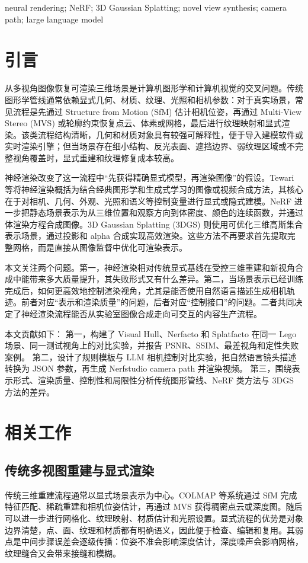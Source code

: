 \documentclass[a4paper, 12pt, centering]{article}
\begin{document}
\begin{enkeys}
neural rendering; NeRF; 3D Gaussian Splatting; novel view synthesis; camera path; large language model
\end{enkeys}
\newpage

\tableofcontents
\newpage

\section{引言}
从多视角图像恢复可渲染三维场景是计算机图形学和计算机视觉的交叉问题。传统图形学管线通常依赖显式几何、材质、纹理、光照和相机参数：对于真实场景，常见流程是先通过 Structure from Motion (SfM) 估计相机位姿，再通过 Multi-View Stereo (MVS) 或轮廓约束恢复点云、体素或网格，最后进行纹理映射和显式渲染。该类流程结构清晰，几何和材质对象具有较强可解释性，便于导入建模软件或实时渲染引擎；但当场景存在细小结构、反光表面、遮挡边界、弱纹理区域或不完整视角覆盖时，显式重建和纹理修复成本较高。

神经渲染改变了这一流程中“先获得精确显式模型，再渲染图像”的假设。Tewari 等将神经渲染概括为结合经典图形学和生成式学习的图像或视频合成方法，其核心在于对相机、几何、外观、光照和语义等控制变量进行显式或隐式建模\cite{tewari2020state}。NeRF 进一步把静态场景表示为从三维位置和观察方向到体密度、颜色的连续函数，并通过体渲染方程合成图像\cite{mildenhall2020nerf}。3D Gaussian Splatting (3DGS) 则使用可优化三维高斯集合表示场景，通过投影和 alpha 合成实现高效渲染\cite{kerbl2023gaussians}。这些方法不再要求首先提取完整网格，而是直接从图像监督中优化可渲染表示。

本文关注两个问题。第一，神经渲染相对传统显式基线在受控三维重建和新视角合成中能带来多大质量提升，其失败形式又有什么差异。第二，当场景表示已经训练完成后，如何更高效地控制渲染视角，尤其是能否使用自然语言描述生成相机轨迹。前者对应“表示和渲染质量”的问题，后者对应“控制接口”的问题。二者共同决定了神经渲染流程能否从实验室图像合成走向可交互的内容生产流程。

本文贡献如下：
第一，构建了 Visual Hull、Nerfacto 和 Splatfacto 在同一 Lego 场景、同一测试视角上的对比实验，并报告 PSNR、SSIM、最差视角和定性失败案例。
第二，设计了规则模板与 LLM 相机控制对比实验，把自然语言镜头描述转换为 JSON 参数，再生成 Nerfstudio camera path 并渲染视频。
第三，围绕表示形式、渲染质量、控制性和局限性分析传统图形管线、NeRF 类方法与 3DGS 方法的差异。

\section{相关工作}
\subsection{传统多视图重建与显式渲染}
传统三维重建流程通常以显式场景表示为中心。COLMAP 等系统通过 SfM 完成特征匹配、稀疏重建和相机位姿估计，再通过 MVS 获得稠密点云或深度图\cite{schonberger2016sfm,schonberger2016mvs}。随后可以进一步进行网格化、纹理映射、材质估计和光照设置。显式流程的优势是对象边界清楚，点、面、纹理和材质都有明确语义，因此便于检查、编辑和复用。其弱点是中间步骤误差会逐级传播：位姿不准会影响深度估计，深度噪声会影响网格，纹理缝合又会带来接缝和模糊。
\end{document}
